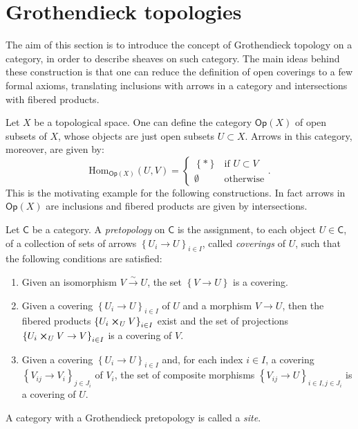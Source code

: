 \section{Grothendieck topologies}
The aim of this section is to introduce
the concept of Grothendieck topology on a category,
in order to describe sheaves on such category.
The main ideas behind these construction is that one can reduce
the definition of open coverings to a few formal axioms, translating
inclusions with arrows in a category and
intersections with fibered products.


\begin{rem}
	Let $X$ be a topological space. 
	One can define the category $\mathsf{Op}(X)$ of open subsets of $X$, whose
	objects are just open subsets $U \subset X$.
	Arrows in this category, moreover, are given by:
	\begin{equation*}
	\mathrm{Hom}_{\mathsf{Op}(X)} \left( U, V \right) =
	\begin{cases}
		\left\{ * \right\} & \text{if } U \subset V\\
		\emptyset & \text{otherwise}
	\end{cases} 
	.\end{equation*}
	This is the motivating example for the following constructions.
	In fact arrows in $\mathsf{Op}(X)$ are inclusions and
	fibered products are given by intersections.
\end{rem}


\begin{defn}[Sites]
	Let $\mathsf{C}$ be a category. 
	A {\em pretopology} on $\mathsf{C}$ is the assignment, to each object $U \in \mathsf{C}$,
	of a collection of sets of arrows $\left\{ U_{ i } \to U \right\}_{ i \in I }$,
	called {\em coverings} of $U$, such that the following conditions are satisfied:
	\begin{enumerate}
		\item Given an isomorphism $V \xrightarrow{\sim} U$, the set $\left\{ V \to U \right\}$
			is a covering.
		\item Given a covering $\left\{ U_{ i } \to U \right\}_{ i \in I }$
			of $U$ and a morphism $V \to U$, then the fibered products
			$\left\{ U_i \cross_{ U } V \right\}_{i \in I}$ exist
			and the set of projections
			$\left\{ U_i \cross_{ U } V \to V \right\}_{ i \in I }$
			is a covering of $V$.
		\item Given a covering $\left\{ U_{ i } \to U \right\}_{ i \in I }$
			and, for each index $i \in I$, a covering 
			$\left\{ V_{ ij } \to V_i \right\}_{ j \in J_i }$ of $V_i$,
			the set of composite morphisms
			$\left\{ V_{ ij } \to U \right\}_{ i \in I, j \in J_i }$
			is a covering of $U$.
	\end{enumerate}
	A category with a Grothendieck pretopology is called a {\em site}.
\end{defn}



